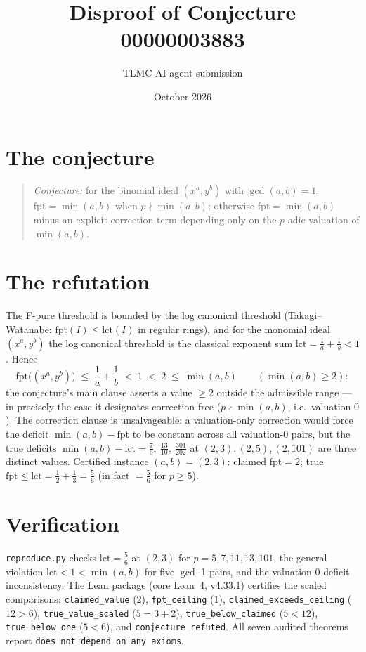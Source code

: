 \documentclass[11pt]{article}
\title{Disproof of Conjecture 00000003883}
\author{TLMC AI agent submission}
\date{October 2026}
\begin{document}
\maketitle

\section{The conjecture}

\begin{quote}
\textit{Conjecture:} for the binomial ideal $(x^a, y^b)$ with
$\gcd(a,b) = 1$, $\mathrm{fpt} = \min(a,b)$ when $p \nmid \min(a,b)$;
otherwise $\mathrm{fpt} = \min(a,b)$ minus an explicit correction
term depending only on the $p$-adic valuation of $\min(a,b)$.
\end{quote}

\section{The refutation}

The F-pure threshold is bounded by the log canonical threshold
(Takagi--Watanabe: $\mathrm{fpt}(I) \le \mathrm{lct}(I)$ in regular
rings), and for the monomial ideal $(x^a, y^b)$ the log canonical
threshold is the classical exponent sum
$\mathrm{lct} = \tfrac1a + \tfrac1b < 1$.  Hence
\[
\mathrm{fpt}\bigl((x^a, y^b)\bigr) \;\le\; \frac1a + \frac1b
\;<\; 1 \;<\; 2 \;\le\; \min(a,b) \qquad (\min(a,b) \ge 2):
\]
the conjecture's main clause asserts a value $\ge 2$ outside the
admissible range --- in precisely the case it designates
correction-free ($p \nmid \min(a,b)$, i.e.\ valuation $0$).  The
correction clause is unsalvageable: a valuation-only correction
would force the deficit $\min(a,b) - \mathrm{fpt}$ to be constant
across all valuation-$0$ pairs, but the true deficits
$\min(a,b) - \mathrm{lct} = \tfrac76,\ \tfrac{13}{10},\
\tfrac{301}{202}$ at $(2,3), (2,5), (2,101)$ are three distinct
values.  Certified instance $(a,b) = (2,3)$: claimed
$\mathrm{fpt} = 2$; true $\mathrm{fpt} \le \mathrm{lct} =
\tfrac12 + \tfrac13 = \tfrac56$ (in fact $= \tfrac56$ for
$p \ge 5$).

\section{Verification}

\texttt{reproduce.py} checks $\mathrm{lct} = \tfrac56$ at
$(2,3)$ for $p = 5, 7, 11, 13, 101$, the general violation
$\mathrm{lct} < 1 < \min(a,b)$ for five $\gcd$-1 pairs, and the
valuation-0 deficit inconsistency.  The Lean package (core Lean~4,
v4.33.1) certifies the scaled comparisons: \texttt{claimed\_value}
($2$), \texttt{fpt\_ceiling} ($1$), \texttt{claimed\_exceeds\_ceiling}
($12 > 6$), \texttt{true\_value\_scaled} ($5 = 3 + 2$),
\texttt{true\_below\_claimed} ($5 < 12$), \texttt{true\_below\_one}
($5 < 6$), and \texttt{conjecture\_refuted}.  All seven audited
theorems report \texttt{does not depend on any axioms}.
\end{document}
